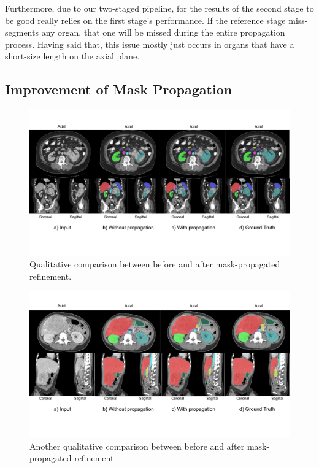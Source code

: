 Furthermore, due to our two-staged pipeline, for the results of the second stage to be good really relies on the first stage's performance.  If the reference stage miss-segments any organ, that one will be missed during the entire propagation process. Having said that, this issue mostly just occurs in organs that have a short-size length on the axial plane.  


\subsection{Improvement of Mask Propagation}

\begin{figure}[!h]
\centering
\includegraphics[width=\textwidth]{content/resources/new_images/qualitative/stcn_improvement.pdf}
\caption{Qualitative comparison between before and after mask-propagated refinement.}
\label{fig:stcn}
\end{figure}

\begin{figure}[!h]
\centering
\includegraphics[width=\textwidth]{content/resources/new_images/qualitative/stcn_improvement2.pdf}
\caption{Another qualitative comparison between before and after mask-propagated refinement }
\label{fig:stcn2}
\end{figure}

